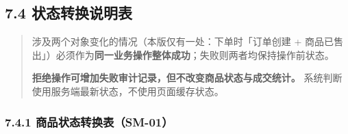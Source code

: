 \documentclass[12pt,a4paper]{ctexart}
\begin{document}
\subsection*{7.4 状态转换说明表}

\begin{quote}\small
涉及两个对象变化的情况（本版仅有一处：下单时「订单创建 + 商品已售出」）必须作为\textbf{同一业务操作整体成功}；失败则两者均保持操作前状态。

\textbf{拒绝操作可增加失败审计记录，但不改变商品状态与成交统计。} 系统判断使用服务端最新状态，不使用页面缓存状态。

\end{quote}

\subsubsection*{7.4.1 商品状态转换表（SM-01）}
\end{document}
